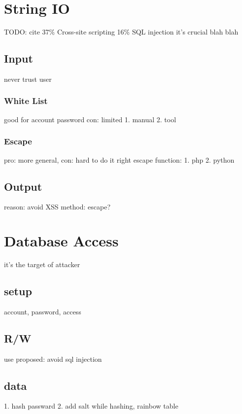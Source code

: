 \documentclass[12pt, a4paper]{article}
\begin{document}
\section{String IO}
TODO: cite
37\% Cross-site scripting
16\% SQL injection
it's crucial
blah blah

\subsection{Input}
never trust user

\subsubsection{White List}
good for account password
con: limited
1. manual
2. tool

\subsubsection{Escape}
pro: more general,
con: hard to do it right
escape function:
1. php
2. python

\subsection{Output}
reason: avoid XSS
method: escape?

\section{Database Access}
it's the target of attacker
\subsection{setup}
account, password, access

\subsection{R/W}
use proposed: avoid sql injection

\subsection{data}
1. hash passward
2. add salt while hashing, rainbow table
\end{document}
